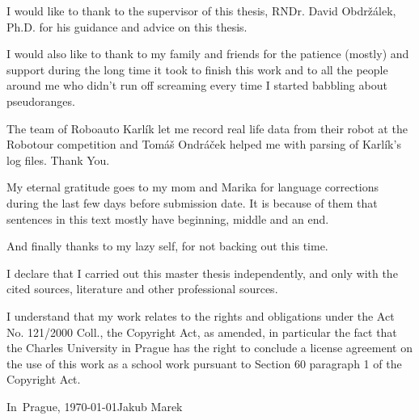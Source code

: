

\noindent
I would like to thank to the supervisor of this thesis,
RNDr. David Obdržálek, Ph.D. for his guidance and advice on this thesis.

I would also like to thank to my family and friends for the patience (mostly) and
support during the long time it took to finish this work and to all the people
around me who didn't run off screaming every time I started babbling about pseudoranges.

The team of Roboauto Karlík let me record real life data from their robot at the
Robotour competition and Tomáš Ondráček helped me with parsing of Karlík's log files.
Thank You.

My eternal gratitude goes to my mom and Marika for language
corrections during the last few days before submission date.
It is because of them that sentences in this text mostly have beginning,
middle and an end.

And finally thanks to my lazy self, for not backing out this time.

\cleartorecto

\vspace*{\fill}
\noindent
I declare that I carried out this master thesis independently, and only with the cited
sources, literature and other professional sources.

I understand that my work relates to the rights and obligations under the Act No.
121/2000 Coll., the Copyright Act, as amended, in particular the fact that the Charles
University in Prague has the right to conclude a license agreement on the use of this
work as a school work pursuant to Section 60 paragraph 1 of the Copyright Act.

\vspace{10mm}
\noindent In~Prague, \today\hspace{\fill}Jakub Marek\\
\vspace{10mm}
\cleartorecto

\tableofcontents*
\cleartorecto
